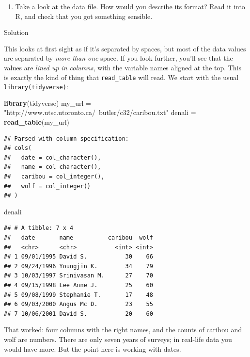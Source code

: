 \documentclass[]{tufte-book}
\newenvironment{Shaded}{}{}
\newcommand{\KeywordTok}[1]{\textcolor[rgb]{0.00,0.44,0.13}{\textbf{#1}}}
\newcommand{\NormalTok}[1]{#1}
\newcommand{\StringTok}[1]{\textcolor[rgb]{0.25,0.44,0.63}{#1}}
\providecommand{\tightlist}{%
  \setlength{\itemsep}{0pt}\setlength{\parskip}{0pt}}
\theoremstyle{definition}
\theoremstyle{definition}
\theoremstyle{definition}
\theoremstyle{remark}
\begin{document}
\begin{enumerate}
\def\labelenumi{(\alph{enumi})}
\tightlist
\item
  Take a look at the data file. How would you describe its format? Read
  it into R, and check that you got something sensible.
\end{enumerate}

Solution

This looks at first sight as if it's separated by spaces, but most of
the data values are separated by \emph{more than one} space. If you look
further, you'll see that the values are \emph{lined up in columns}, with
the variable names aligned at the top. This is exactly the kind of thing
that \texttt{read\_table} will read. We start with the usual
\texttt{library(tidyverse)}:

\begin{Shaded}
\begin{Highlighting}[]
\KeywordTok{library}\NormalTok{(tidyverse)}
\NormalTok{my_url =}\StringTok{ "http://www.utsc.utoronto.ca/~butler/c32/caribou.txt"}
\NormalTok{denali =}\StringTok{ }\KeywordTok{read_table}\NormalTok{(my_url)}
\end{Highlighting}
\end{Shaded}

\begin{verbatim}
## Parsed with column specification:
## cols(
##   date = col_character(),
##   name = col_character(),
##   caribou = col_integer(),
##   wolf = col_integer()
## )
\end{verbatim}

\begin{Shaded}
\begin{Highlighting}[]
\NormalTok{denali}
\end{Highlighting}
\end{Shaded}

\begin{verbatim}
## # A tibble: 7 x 4
##   date       name          caribou  wolf
##   <chr>      <chr>           <int> <int>
## 1 09/01/1995 David S.           30    66
## 2 09/24/1996 Youngjin K.        34    79
## 3 10/03/1997 Srinivasan M.      27    70
## 4 09/15/1998 Lee Anne J.        25    60
## 5 09/08/1999 Stephanie T.       17    48
## 6 09/03/2000 Angus Mc D.        23    55
## 7 10/06/2001 David S.           20    60
\end{verbatim}

That worked: four columns with the right names, and the counts of
caribou and wolf are numbers. There are only seven years of surveys; in
real-life data you would have more. But the point here is working with
dates.
\end{document}
